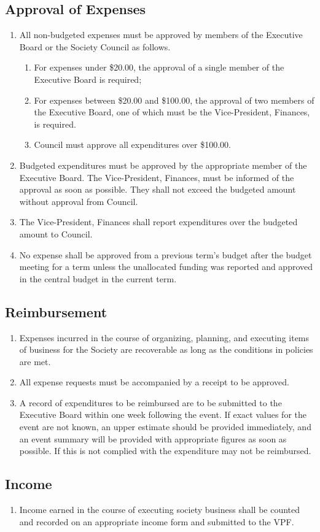 \subsection{Approval of Expenses}
\begin{enumerate}
    \item All non-budgeted expenses must be approved by members of the
        Executive Board or the Society Council as follows.
        \begin{enumerate}
            \item For expenses under \$20.00, the approval of a single member
                of the Executive Board is required;
            \item For expenses between \$20.00 and \$100.00, the approval of
                two members of the Executive Board, one of which must be the
                Vice-President, Finances, is required.
            \item Council must approve all expenditures over \$100.00.
        \end{enumerate}
    \item Budgeted expenditures must be approved by the appropriate member of
        the Executive Board. The Vice-President, Finances, must be informed of
        the approval as soon as possible. They shall not exceed the budgeted
        amount without approval from Council.
    \item The Vice-President, Finances shall report expenditures over the
        budgeted amount to Council.
    \item No expense shall be approved from a previous term's budget after the
        budget meeting for a term unless the unallocated funding was reported
        and approved in the central budget in the current term.
\end{enumerate}

\subsection{Reimbursement}
\begin{enumerate}
    \item Expenses incurred in the course of organizing, planning, and
        executing items of business for the Society are recoverable as long as
        the conditions in policies are met.
    \item All expense requests must be accompanied by a receipt to be approved.
    \item A record of expenditures to be reimbursed are to be submitted to the
        Executive Board within one week following the event. If exact values
        for the event are not known, an upper estimate should be provided
        immediately, and an event summary will be provided with appropriate
        figures as soon as possible. If this is not complied with the
        expenditure may not be reimbursed.
\end{enumerate}

\subsection{Income}
\begin{enumerate}
    \item Income earned in the course of executing society business shall be
        counted and recorded on an appropriate income form and submitted to the
        VPF.
\end{enumerate}

